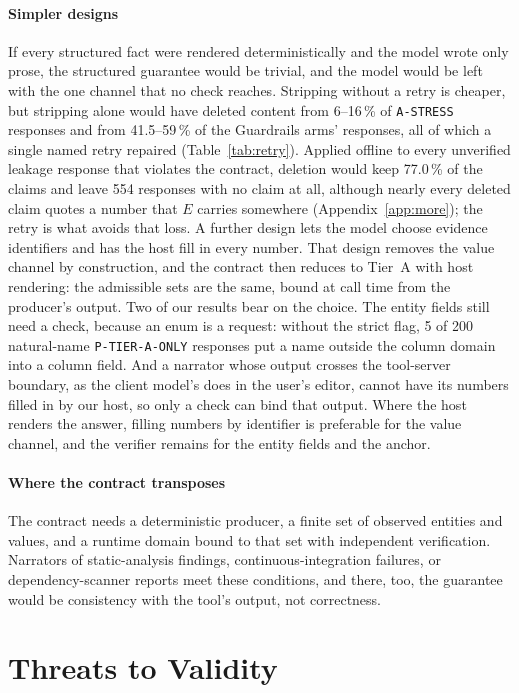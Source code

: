 \documentclass[smallextended,natbib]{svjour3}
\begin{document}
\paragraph{Simpler designs}
If every structured fact were rendered deterministically and the model wrote
only prose, the structured guarantee would be trivial, and the model would be
left with the one channel that no check reaches. Stripping without a retry is
cheaper, but stripping alone would have deleted content from 6--16\,\% of
\texttt{A-STRESS} responses and from 41.5--59\,\% of the Guardrails arms'
responses, all of which a single named retry repaired (Table~\ref{tab:retry}).
Applied offline to every unverified leakage response that violates the
contract, deletion would keep 77.0\,\% of the claims and leave 554 responses
with no claim at all, although nearly every deleted claim quotes a number that
$E$ carries somewhere (Appendix~\ref{app:more}); the retry is what avoids that
loss.
A further design lets the model choose evidence identifiers and has the host
fill in every number. That design removes the value channel by construction,
and the contract then reduces to Tier~A with host rendering: the admissible
sets are the same, bound at call time from the producer's output. Two of our
results bear on the choice. The entity fields still need a check, because an
enum is a request: without the strict flag, 5 of 200 natural-name
\texttt{P-TIER-A-ONLY} responses put a name outside the column domain into a
column field. And a narrator whose output crosses the tool-server boundary, as
the client model's does in the user's editor, cannot have its numbers filled
in by our host, so only a check can bind that output. Where the host renders
the answer, filling numbers by identifier is preferable for the value channel,
and the verifier remains for the entity fields and the anchor.


\paragraph{Where the contract transposes}
The contract needs a deterministic producer, a finite set of observed entities
and values, and a runtime domain bound to that set with independent
verification. Narrators of static-analysis findings, continuous-integration
failures, or dependency-scanner reports meet these conditions, and there, too,
the guarantee would be consistency with the tool's output, not correctness.

\section{Threats to Validity}\label{sec:threats}
\end{document}
